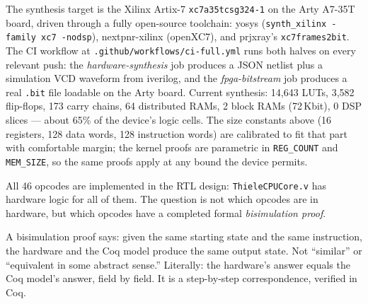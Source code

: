 \documentclass[11pt,a4paper]{article}
\theoremstyle{plain}
\theoremstyle{definition}
\theoremstyle{remark}
\begin{document}
The synthesis target is the Xilinx Artix-7 \texttt{xc7a35tcsg324-1} on the Arty A7-35T board, driven through a fully open-source toolchain: yosys (\texttt{synth\_xilinx -family xc7 -nodsp}), nextpnr-xilinx (openXC7), and prjxray's \texttt{xc7frames2bit}. The CI workflow at \texttt{.github/workflows/ci-full.yml} runs both halves on every relevant push: the \emph{hardware-synthesis} job produces a JSON netlist plus a simulation VCD waveform from iverilog, and the \emph{fpga-bitstream} job produces a real \texttt{.bit} file loadable on the Arty board. Current synthesis: 14{,}643 LUTs, 3{,}582 flip-flops, 173 carry chains, 64 distributed RAMs, 2 block RAMs (72\,Kbit), 0 DSP slices --- about 65\% of the device's logic cells. The size constants above (16 registers, 128 data words, 128 instruction words) are calibrated to fit that part with comfortable margin; the kernel proofs are parametric in \texttt{REG\_COUNT} and \texttt{MEM\_SIZE}, so the same proofs apply at any bound the device permits.

All 46 opcodes are implemented in the RTL design: \texttt{ThieleCPUCore.v} has hardware logic for all of them. The question is not which opcodes are in hardware, but which opcodes have a completed formal \emph{bisimulation proof}.

A bisimulation proof says: given the same starting state and the same instruction, the hardware and the Coq model produce the same output state. Not ``similar'' or ``equivalent in some abstract sense.'' Literally: the hardware's answer equals the Coq model's answer, field by field. It is a step-by-step correspondence, verified in Coq.
\end{document}
